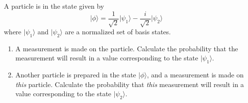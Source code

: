 \begin{problem}
A particle is in the state given by
\[ \vert\mbox{$\phi$}\rangle = \frac{1}{\sqrt{2}} \vert\mbox{$\psi_1$}\rangle - \frac{i}{\sqrt{2}} \vert\mbox{$\psi_2$}\rangle \]
where $\vert\mbox{$\psi_1$}\rangle$ and $\vert\mbox{$\psi_2$}\rangle$ are a normalized set of basis states.
\begin{enumerate}
\item A measurement is made on the particle.  Calculate the probability 
that the measurement will result in a value corresponding to the state
$\vert\mbox{$\psi_1$}\rangle$.
\item Another particle is prepared in the state $\vert\mbox{$\phi$}\rangle$, 
and a measurement is made on {\it this} particle. Calculate the probability 
that {\it this} measurement will result in a value corresponding to 
the state $\vert\mbox{$\psi_2$}\rangle$.
\end{enumerate}
\label{prob:SuperpositionProbs2}
\end{problem}

